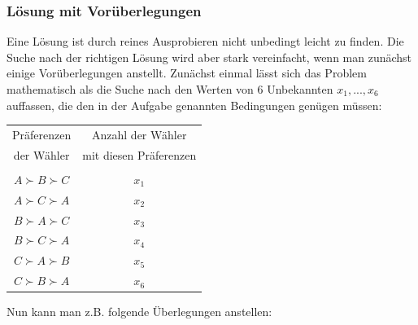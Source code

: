 \documentclass[10pt, a4paper, german]{article}
\numberwithin {equation}{section}
\begin{document}
\subsubsection{Lösung mit Vorüberlegungen}

Eine Lösung ist durch reines Ausprobieren nicht unbedingt
leicht zu finden. Die Suche nach der richtigen Lösung wird aber stark
vereinfacht, wenn man zunächst einige Vorüberlegungen
anstellt. Zunächst einmal lässt sich das Problem mathematisch als die
Suche nach den Werten von 6 Unbekannten $x_1, ..., x_6$ auffassen, die
den in der Aufgabe genannten Bedingungen genügen müssen:

\begin{center}
\begin{tabular}{c|c}
Präferenzen & Anzahl der Wähler \\
der Wähler  & mit diesen Präferenzen \\
\cline{1-2}
 & \\ 
$A \succ B \succ C$ & $x_1$ \\
$A \succ C \succ A$ & $x_2$ \\
$B \succ A \succ C$ & $x_3$ \\
$B \succ C \succ A$ & $x_4$ \\
$C \succ A \succ B$ & $x_5$ \\
$C \succ B \succ A$ & $x_6$ \\
\end{tabular}
\end{center}

Nun kann man z.B. folgende Überlegungen anstellen:
\end{document}
